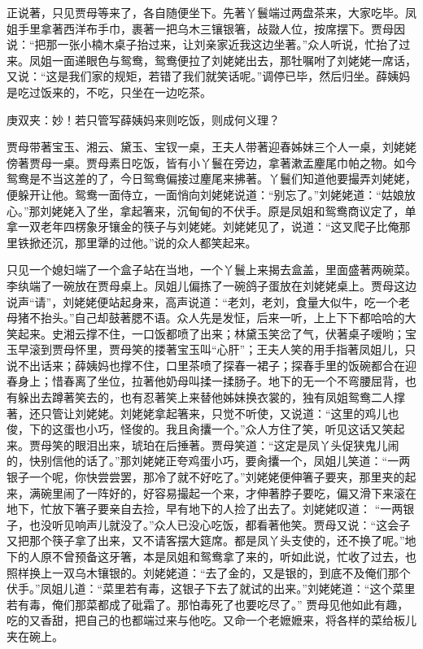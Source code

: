 \begin{parag}
    正说著，只见贾母等来了，各自随便坐下。先著丫鬟端过两盘茶来，大家吃毕。凤姐手里拿著西洋布手巾，裹著一把乌木三镶银箸，敁敠人位，按席摆下。贾母因说：“把那一张小楠木桌子抬过来，让刘亲家近我这边坐著。”众人听说，忙抬了过来。凤姐一面递眼色与鸳鸯，鸳鸯便拉了刘姥姥出去，那牡嘱咐了刘姥姥一席话，又说：“这是我们家的规矩，若错了我们就笑话呢。”调停已毕，然后归坐。薛姨妈是吃过饭来的，不吃，只坐在一边吃茶。\begin{note}庚双夹：妙！若只管写薛姨妈来则吃饭，则成何义理？\end{note}贾母带著宝玉、湘云、黛玉、宝钗一桌，王夫人带著迎春姊妹三个人一桌，刘姥姥傍著贾母一桌。贾母素日吃饭，皆有小丫鬟在旁边，拿著漱盂麈尾巾帕之物。如今鸳鸯是不当这差的了，今日鸳鸯偏接过麈尾来拂著。丫鬟们知道他要撮弄刘姥姥，便躲开让他。鸳鸯一面侍立，一面悄向刘姥姥说道：“别忘了。”刘姥姥道：“姑娘放心。”那刘姥姥入了坐，拿起箸来，沉甸甸的不伏手。原是凤姐和鸳鸯商议定了，单拿一双老年四楞象牙镶金的筷子与刘姥姥。刘姥姥见了，说道：“这叉爬子比俺那里铁掀还沉，那里犟的过他。”说的众人都笑起来。
\end{parag}


\begin{parag}
    只见一个媳妇端了一个盒子站在当地，一个丫鬟上来揭去盒盖，里面盛著两碗菜。李纨端了一碗放在贾母桌上。凤姐儿偏拣了一碗鸽子蛋放在刘姥姥桌上。贾母这边说声“请”，刘姥姥便站起身来，高声说道：“老刘，老刘，食量大似牛，吃一个老母猪不抬头。”自己却鼓著腮不语。众人先是发怔，后来一听，上上下下都哈哈的大笑起来。史湘云撑不住，一口饭都喷了出来；林黛玉笑岔了气，伏著桌子嗳哟；宝玉早滚到贾母怀里，贾母笑的搂著宝玉叫“心肝”；王夫人笑的用手指著凤姐儿，只说不出话来；薛姨妈也撑不住，口里茶喷了探春一裙子；探春手里的饭碗都合在迎春身上；惜春离了坐位，拉著他奶母叫揉一揉肠子。地下的无一个不弯腰屈背，也有躲出去蹲著笑去的，也有忍著笑上来替他姊妹换衣裳的，独有凤姐鸳鸯二人撑著，还只管让刘姥姥。刘姥姥拿起箸来，只觉不听使，又说道：“这里的鸡儿也俊，下的这蛋也小巧，怪俊的。我且肏攮一个。”众人方住了笑，听见这话又笑起来。贾母笑的眼泪出来，琥珀在后捶著。贾母笑道：“这定是凤丫头促狭鬼儿闹的，快别信他的话了。”那刘姥姥正夸鸡蛋小巧，要肏攮一个，凤姐儿笑道：“一两银子一个呢，你快尝尝罢，那冷了就不好吃了。”刘姥姥便伸箸子要夹，那里夹的起来，满碗里闹了一阵好的，好容易撮起一个来，才伸著脖子要吃，偏又滑下来滚在地下，忙放下箸子要亲自去捡，早有地下的人捡了出去了。刘姥姥叹道： “一两银子，也没听见响声儿就没了。”众人已没心吃饭，都看著他笑。贾母又说：“这会子又把那个筷子拿了出来，又不请客摆大筵席。都是凤丫头支使的，还不换了呢。”地下的人原不曾预备这牙箸，本是凤姐和鸳鸯拿了来的，听如此说，忙收了过去，也照样换上一双乌木镶银的。刘姥姥道：“去了金的，又是银的，到底不及俺们那个伏手。”凤姐儿道：“菜里若有毒，这银子下去了就试的出来。”刘姥姥道：“这个菜里若有毒，俺们那菜都成了砒霜了。那怕毒死了也要吃尽了。” 贾母见他如此有趣，吃的又香甜，把自己的也都端过来与他吃。又命一个老嬷嬷来，将各样的菜给板儿夹在碗上。
\end{parag}


